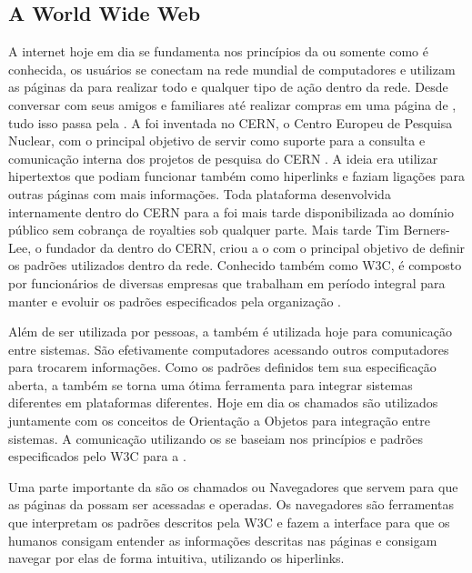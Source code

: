 \documentclass[espaco=simples,appendix=Name]{abnt}
\begin{document}
\begin{description}

\section{A World Wide Web}

\item \noindent
A internet hoje em dia se fundamenta nos princípios da  ou somente  como é conhecida, os usuários se conectam na rede mundial de computadores e utilizam as páginas da  para realizar todo e qualquer tipo de ação dentro da rede. Desde conversar com seus amigos e familiares até realizar compras em uma página de , tudo isso passa pela . A  foi inventada no CERN, o Centro Europeu de Pesquisa Nuclear, com o principal objetivo de servir como suporte para a consulta e comunicação interna dos projetos de pesquisa do CERN \cite{WebStory}. A ideia era utilizar hipertextos que podiam funcionar também como hiperlinks e faziam ligações para outras páginas com mais informações. Toda plataforma desenvolvida internamente dentro do CERN para a  foi mais tarde disponibilizada ao domínio público sem cobrança de royalties sob qualquer parte. Mais tarde Tim Berners-Lee, o fundador da  dentro do CERN, criou a o  com o principal objetivo de definir os padrões utilizados dentro da rede. Conhecido também como W3C, é composto por funcionários de diversas empresas que trabalham em período integral para manter e evoluir os padrões especificados pela organização \cite{W3Cfacts}.

Além de ser utilizada por pessoas, a  também é utilizada hoje para comunicação entre sistemas. São efetivamente computadores acessando outros computadores para trocarem informações. Como os padrões definidos tem sua especificação aberta, a  também se torna uma ótima ferramenta para integrar sistemas diferentes em plataformas diferentes. Hoje em dia os chamados  são utilizados juntamente com os conceitos de Orientação a Objetos para integração entre sistemas. A comunicação utilizando os  se baseiam nos princípios e padrões especificados pelo W3C para a  \cite{WebServices}.

Uma parte importante da  são os chamados  ou Navegadores que servem para que as páginas da  possam ser acessadas e operadas. Os navegadores são ferramentas que interpretam os padrões descritos pela W3C e fazem a interface para que os humanos consigam entender as informações descritas nas páginas e consigam navegar por elas de forma intuitiva, utilizando os hiperlinks.


\end{description}
\end{document}
